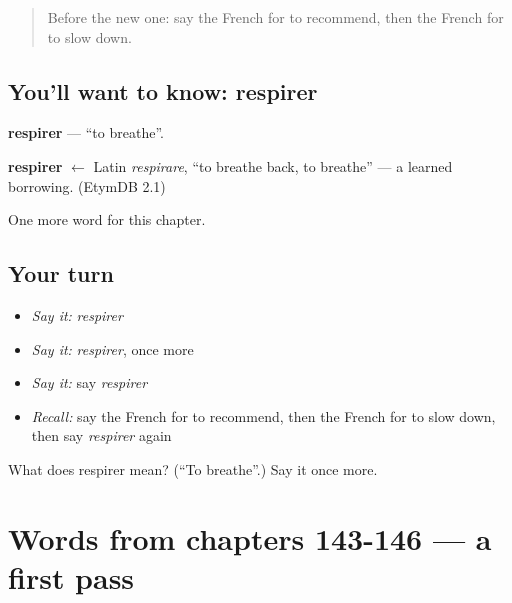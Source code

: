 \label{lesson:FR-C151-respirer}



\begin{quote}
Before the new one: say the French for to recommend, then the French for to slow down.
\end{quote}

\subsection*{You'll want to know: respirer}
\textbf{respirer} — \textquotedblleft{}to breathe\textquotedblright{}.

\begin{cousinweb}
\textbf{respirer} $\leftarrow$ Latin \emph{respirare}, \textquotedblleft{}to breathe back, to breathe\textquotedblright{} — a learned borrowing. (EtymDB 2.1)
\end{cousinweb}

\begin{grammarlens}[title={What you've built}]
One more word for this chapter.
\end{grammarlens}

\subsection*{Your turn}
\begin{itemize}
\raggedright
  \item \emph{Say it:} \emph{respirer}
  \item \emph{Say it:} \emph{respirer}, once more
  \item \emph{Say it:} say \emph{respirer}
  \item \emph{Recall:} say the French for to recommend, then the French for to slow down, then say \emph{respirer} again
\end{itemize}

\begin{tcolorbox}[breakable,colback=teal!4,colframe=teal!35!black,title={Before you move on}]
What does respirer mean? (\textquotedblleft{}To breathe\textquotedblright{}.) Say it once more.
\end{tcolorbox}
\section[(dialogue)]{Words from chapters 143-146 — a first pass}

\label{lesson:FR-R151-first-pass-words-from-chapters-143-146}



